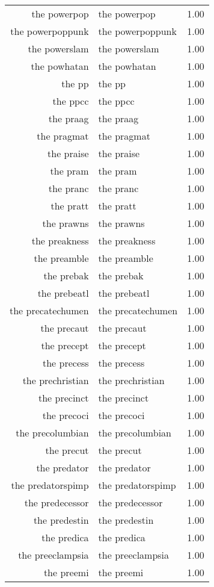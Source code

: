 \begin{table}[ht]
\begin{tabular}{rlr}
  the powerpop & the powerpop & 1.00 \\ 
  the powerpoppunk & the powerpoppunk & 1.00 \\ 
  the powerslam & the powerslam & 1.00 \\ 
  the powhatan & the powhatan & 1.00 \\ 
  the pp & the pp & 1.00 \\ 
  the ppcc & the ppcc & 1.00 \\ 
  the praag & the praag & 1.00 \\ 
  the pragmat & the pragmat & 1.00 \\ 
  the praise & the praise & 1.00 \\ 
  the pram & the pram & 1.00 \\ 
  the pranc & the pranc & 1.00 \\ 
  the pratt & the pratt & 1.00 \\ 
  the prawns & the prawns & 1.00 \\ 
  the preakness & the preakness & 1.00 \\ 
  the preamble & the preamble & 1.00 \\ 
  the prebak & the prebak & 1.00 \\ 
  the prebeatl & the prebeatl & 1.00 \\ 
  the precatechumen & the precatechumen & 1.00 \\ 
  the precaut & the precaut & 1.00 \\ 
  the precept & the precept & 1.00 \\ 
  the precess & the precess & 1.00 \\ 
  the prechristian & the prechristian & 1.00 \\ 
  the precinct & the precinct & 1.00 \\ 
  the precoci & the precoci & 1.00 \\ 
  the precolumbian & the precolumbian & 1.00 \\ 
  the precut & the precut & 1.00 \\ 
  the predator & the predator & 1.00 \\ 
  the predatorspimp & the predatorspimp & 1.00 \\ 
  the predecessor & the predecessor & 1.00 \\ 
  the predestin & the predestin & 1.00 \\ 
  the predica & the predica & 1.00 \\ 
  the preeclampsia & the preeclampsia & 1.00 \\ 
  the preemi & the preemi & 1.00 \\ 

\end{tabular}
\end{table}
